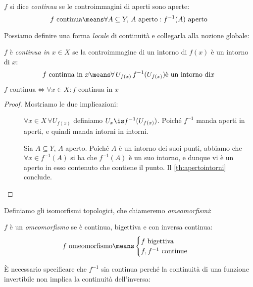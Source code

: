 \begin{defn}[Continuità]
	$f$ si dice \emph{continua} se le controimmagini di aperti sono aperte:
	\[f\text{ continua}\means
	\forall A\subseteq Y,\,A\text{ aperto}:f^{-1}(A)\text{ aperto}\]
\end{defn}

Possiamo definire una forma \emph{locale} di continuità e collegarla alla nozione globale:

\begin{defn}
	$f$ è \emph{continua in $x\in X$} se la controimmagine di un intorno di $f(x)$ è un intorno di $x$:
	\[f\text{ continua in }x\means
	\forall\, U_{f(x)}\, f^{-1}(U_{f(x)})\text{è un intorno di}x\]
\end{defn}

\begin{prop}
	$f\text{ continua}\iff\forall x\in X:f\text{ continua in }x$
\end{prop}

\begin{proof}
	Mostriamo le due implicazioni:
	\begin{description}
		\item[\proofrightarrow]
			$\forall x\in X\,\forall U_{f(x)}$ definiamo $U_x\is f^{-1}(U_{f(x)})$.
			Poiché $f^{-1}$ manda aperti in aperti, e quindi manda intorni in intorni.
		\item[\proofleftarrow]
			Sia  $A\subseteq Y$, $A$ aperto.
			Poiché $A$ è un intorno dei suoi punti, abbiamo che
			$\forall x\in f^{-1}(A)$ si ha che $f^{-1}(A)$ è un suo intorno, e dunque vi è un aperto in esso contenuto che contiene il punto.
			Il \autoref{th:apertointorni} conclude.
			\qedhere
	\end{description}
\end{proof}

Definiamo gli isomorfismi topologici, che chiameremo \emph{omeomorfismi}:

\begin{defn}[Omeomorfismo]
	$f$ è un \emph{omeomorfismo} se è continua, bigettiva e con inversa continua:
	\[f\text{ omeomorfismo}\means
	\begin{cases}
		f\text{ bigettiva }\\
		f, f^{-1}\text{ continue}
	\end{cases}\]
\end{defn}

È necessario specificare che $f^{-1}$ sia continua perché la continuità di una funzione invertibile non implica la continuità dell'inversa:

